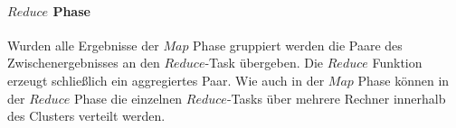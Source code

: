 \paragraph{$Reduce$ Phase}$\;$ \\
Wurden alle Ergebnisse der $Map$ Phase gruppiert werden die Paare des Zwischenergebnisses an den $Reduce$-Task übergeben. Die $Reduce$ Funktion erzeugt schließlich ein aggregiertes Paar. Wie auch in der $Map$ Phase können in der $Reduce$ Phase die einzelnen $Reduce$-Tasks über mehrere Rechner innerhalb des Clusters verteilt werden.

